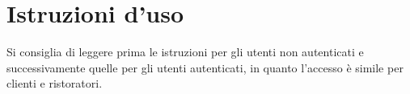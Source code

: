 \section{Istruzioni d'uso}

Si consiglia di leggere prima le istruzioni per gli utenti non autenticati e 
successivamente quelle per gli utenti autenticati, in quanto l'accesso è simile 
per clienti e ristoratori.




